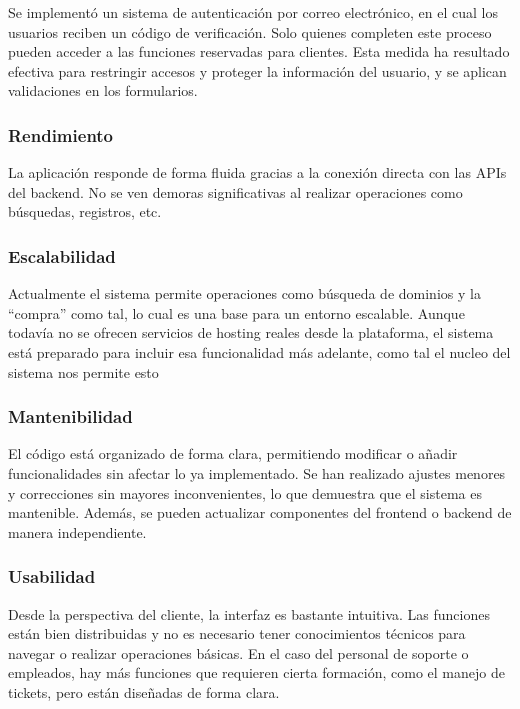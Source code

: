 Se implementó un sistema de autenticación por correo electrónico, en el cual los usuarios reciben un código de verificación. Solo quienes completen este proceso pueden acceder a las funciones reservadas para clientes. Esta medida ha resultado efectiva para restringir accesos y proteger la información del usuario, y se aplican validaciones en los formularios.


\subsubsection{Rendimiento}

La aplicación responde de forma fluida gracias a la conexión directa con las APIs del backend. No se ven demoras significativas al realizar operaciones como búsquedas, registros, etc.


\subsubsection{Escalabilidad}

Actualmente el sistema permite operaciones como búsqueda de dominios y la “compra” como tal, lo cual es una base para un entorno escalable. Aunque todavía no se ofrecen servicios de hosting reales desde la plataforma, el sistema está preparado para incluir esa funcionalidad más adelante, como tal el nucleo del sistema nos permite esto


\subsubsection{Mantenibilidad}

El código está organizado de forma clara, permitiendo modificar o añadir funcionalidades sin afectar lo ya implementado. Se han realizado ajustes menores y correcciones sin mayores inconvenientes, lo que demuestra que el sistema es mantenible. Además, se pueden actualizar componentes del frontend o backend de manera independiente.


\subsubsection{Usabilidad}

Desde la perspectiva del cliente, la interfaz es bastante intuitiva. Las funciones están bien distribuidas y no es necesario tener conocimientos técnicos para navegar o realizar operaciones básicas. En el caso del personal de soporte o empleados, hay más funciones que requieren cierta formación, como el manejo de tickets, pero están diseñadas de forma clara.


